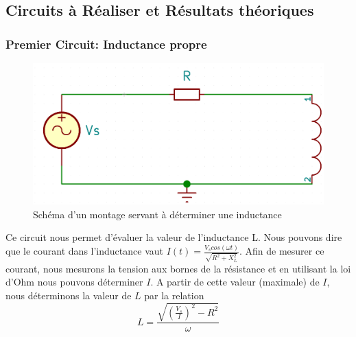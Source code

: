 \documentclass{article}
\begin{document}
\subsection{Circuits à Réaliser et Résultats théoriques}
\subsubsection{Premier Circuit: Inductance propre}
\begin{figure}[h]
    \centering
        \includegraphics[scale = 0.12]{LR.png}
        \caption{Schéma d'un montage servant à déterminer une inductance}
        \label{fig:my_label}
    \end{figure}
Ce circuit nous permet d'évaluer la valeur de l'inductance L. Nous pouvons dire que le courant dans l'inductance vaut
$I(t) = \frac{V_{s}cos(\omega t)}{\sqrt{R^{2} + X_{L}^{2}}}$. Afin de mesurer ce courant, nous mesurons la tension aux
bornes de la résistance et en utilisant la loi d'Ohm nous pouvons déterminer $I$. A partir de cette valeur (maximale) de
$I$, nous déterminons la valeur de $L$ par la relation 
\begin{equation}
    L = \frac{\sqrt{(\frac{V_{s}}{I})^2 - R^2}}{\omega}
\end{equation}
\end{document}
